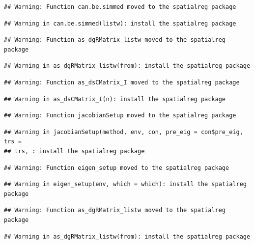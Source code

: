 \documentclass[11pt,]{article}
\begin{document}
\begin{verbatim}
## Warning: Function can.be.simmed moved to the spatialreg package
\end{verbatim}

\begin{verbatim}
## Warning in can.be.simmed(listw): install the spatialreg package
\end{verbatim}

\begin{verbatim}
## Warning: Function as_dgRMatrix_listw moved to the spatialreg package
\end{verbatim}

\begin{verbatim}
## Warning in as_dgRMatrix_listw(from): install the spatialreg package
\end{verbatim}

\begin{verbatim}
## Warning: Function as_dsCMatrix_I moved to the spatialreg package
\end{verbatim}

\begin{verbatim}
## Warning in as_dsCMatrix_I(n): install the spatialreg package
\end{verbatim}

\begin{verbatim}
## Warning: Function jacobianSetup moved to the spatialreg package
\end{verbatim}

\begin{verbatim}
## Warning in jacobianSetup(method, env, con, pre_eig = con$pre_eig, trs =
## trs, : install the spatialreg package
\end{verbatim}

\begin{verbatim}
## Warning: Function eigen_setup moved to the spatialreg package
\end{verbatim}

\begin{verbatim}
## Warning in eigen_setup(env, which = which): install the spatialreg package
\end{verbatim}

\begin{verbatim}
## Warning: Function as_dgRMatrix_listw moved to the spatialreg package
\end{verbatim}

\begin{verbatim}
## Warning in as_dgRMatrix_listw(from): install the spatialreg package
\end{verbatim}
\end{document}
